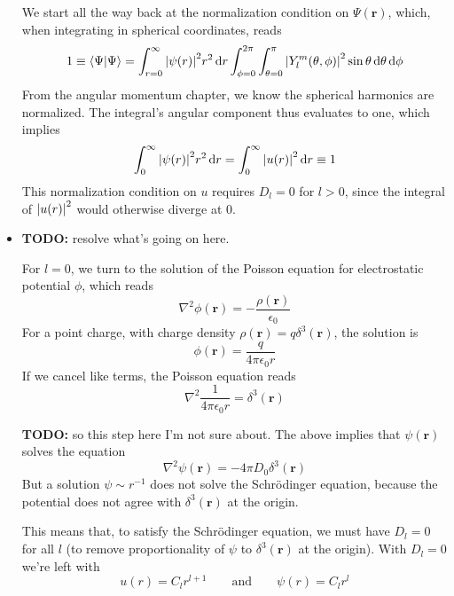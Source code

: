 \documentclass[11pt, a4paper]{article}
\newcommand{\diff}{\mathop{}\!\mathrm{d}} %
\renewcommand{\laplacian}{\nabla^{2}}
\newcommand{\eqtext}[1]{\qquad \text{#1} \qquad}
\newcommand{\Schro}{Schr\"{o}dinger\xspace}
\renewcommand{\vec}[1]{\bm{#1}}  %
\renewcommand{\r}{\vec{r}}  %
\newcommand{\p}{\psi}  %
\renewcommand{\P}{\Psi}  %
\begin{document}
\begin{itemize}
	We start all the way back at the normalization condition on $ \P(\r) $, which, when integrating in spherical coordinates, reads
	\begin{equation*}
		1 \equiv \braket{\P}{\P} = \int_{r = 0}^{\infty}\abs{\p(r)}^{2}r^{2}\diff r \int_{\phi = 0}^{2\pi}\int_{\theta = 0}^{\pi}\abs{Y_{l}^{m}(\theta, \phi)}^{2}\sin \theta \diff \theta \diff \phi 
	\end{equation*}
	From the angular momentum chapter, we know the spherical harmonics are normalized. The integral's angular component thus evaluates to one, which implies
	\begin{equation*}
		\int_{ 0}^{\infty}\abs{\p(r)}^{2}r^{2}\diff r = \int_{0}^{\infty}\abs{u(r)}^{2}\diff r \equiv 1
	\end{equation*}
	This normalization condition on $ u $ requires $ D_{l} = 0 $ for $ l > 0 $, since the integral of $ \abs{u(r)}^{2} $ would otherwise diverge at $ 0 $. 
	
	\item \textbf{TODO:} resolve what's going on here.
	
	For $ l = 0 $, we turn to the solution of the Poisson equation for electrostatic potential $ \phi $, which reads
	\begin{equation*}
		\laplacian \phi(\r) = -\frac{\rho(\r)}{\epsilon_{0}}
	\end{equation*}
	For a point charge, with charge density $ \rho(\r) = q \delta^{3}(\r) $, the solution is 
	\begin{equation*}
		\phi(\r) = \frac{q}{4\pi \epsilon_{0}r}
	\end{equation*}
	If we cancel like terms, the Poisson equation reads
	\begin{equation*}
		\laplacian \frac{1}{4\pi \epsilon_{0}r} = \delta^{3}(\r)
	\end{equation*}
	
	\textbf{TODO:} so this step here I'm not sure about. The above implies that $ \p(\r) $ solves the equation
	\begin{equation*}
		\laplacian \p(\r) = - 4 \pi D_{0} \delta^{3}(\r)
	\end{equation*}
	But a solution $ \p \sim r^{-1} $ does not solve the \Schro equation, because the potential does not agree with $ \delta^{3}(\r) $ at the origin. 
	
	This means that, to satisfy the \Schro equation, we must have $ D_{l} = 0 $ for all $ l $ (to remove proportionality of $ \psi $ to $ \delta^{3}(\r) $ at the origin). With $ D_{l} = 0 $ we're left with 
	\begin{equation*}
		u(r) = C_{l}r^{l+1} \eqtext{and} \p(r) = C_{l}r^{l}
	\end{equation*}
	
\end{itemize}
\end{document}
